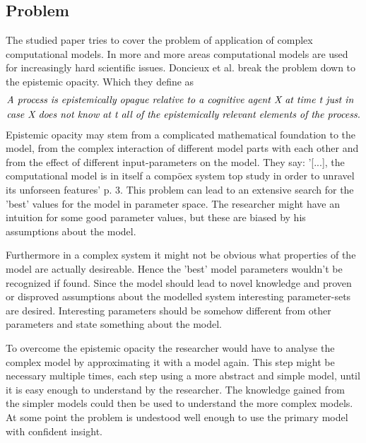 \documentclass[12pt,twoside]{article}
\theoremstyle{plain}
\theoremstyle{definition}
\theoremstyle{remark}
\begin{document}
\subsection{Problem}
The studied paper \cite{doncieux2015multi} tries to cover the problem of application of complex computational models.
In more and more areas computational models are used for increasingly hard scientific issues.
Doncieux et al. break the problem down to the epistemic opacity. Which they define as
\begin{align*}
	&\text{\textit{A process is epistemically opague relative to a cognitive agent X at time t just in}}\\
	&\text{\textit{case X does not know at t all of the epistemically relevant elements of the process.}}
\end{align*}
Epistemic opacity may stem from a complicated mathematical foundation to the model, from the complex interaction of different model parts with each other and from the effect of different input-parameters on the model.
They say: '[...], the computational model is in itself a compöex system top study in order to unravel its unforseen features' \cite{doncieux2015multi} p. 3.
This problem can lead to an extensive search for the 'best' values for the model in parameter space.
The researcher might have an intuition for some good parameter values, but these are biased by his assumptions about the model. 

Furthermore in a complex system it might not be obvious what properties of the model are actually desireable. Hence the 'best' model parameters wouldn't be recognized if found.
Since the model should lead to novel knowledge and proven or disproved assumptions about the modelled system interesting parameter-sets are desired. Interesting parameters should be somehow different from other parameters and state something about the model.

To overcome the epistemic opacity the researcher would have to analyse the complex model by approximating it with a model again. This step might be necessary multiple times, each step using a more abstract and simple model, until it is easy enough to understand by the researcher. The knowledge gained from the simpler models could then be used to understand the more complex models. At some point the problem is undestood well enough to use the primary model with confident insight.
\end{document}
